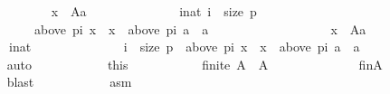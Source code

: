 \begin{isabellebody}
\ \ \ \ \ \ \ \ \isamarkupfalse%
\isanewline
\ \ \ \ \ \ \ \ \ \ {\isachardoublequoteopen}{\isasymnot}{\isacharparenleft}{\kern0pt}{\isasymforall}x\ {\isasymin}\ A{\isacharminus}{\kern0pt}{\isacharbraceleft}{\kern0pt}a{\isacharbraceright}{\kern0pt}{\isachardot}{\kern0pt}\isanewline
\ \ \ \ \ \ \ \ \ \ \ \ \ \ {\isasymforall}i{\isacharcolon}{\kern0pt}{\isacharcolon}{\kern0pt}nat{\isachardot}{\kern0pt}\ i\ {\isacharless}{\kern0pt}\ size\ p\ {\isasymlongrightarrow}\isanewline
\ \ \ \ \ \ \ \ \ \ \ \ \ \ \ \ {\isacharparenleft}{\kern0pt}above\ {\isacharparenleft}{\kern0pt}p{\isacharbang}{\kern0pt}i{\isacharparenright}{\kern0pt}\ x\ {\isacharequal}{\kern0pt}\ {\isacharbraceleft}{\kern0pt}x{\isacharbraceright}{\kern0pt}\ {\isasymlongrightarrow}\ above\ {\isacharparenleft}{\kern0pt}p{\isacharbang}{\kern0pt}i{\isacharparenright}{\kern0pt}\ a\ {\isasymnoteq}\ {\isacharbraceleft}{\kern0pt}a{\isacharbraceright}{\kern0pt}{\isacharparenright}{\kern0pt}{\isacharparenright}{\kern0pt}{\isachardoublequoteclose}\isanewline
\ \ \ \ \ \ \ \ \isamarkupfalse%
\isanewline
\ \ \ \ \ \ \ \ \ \ {\isachardoublequoteopen}{\isasymexists}x\ {\isasymin}\ A{\isacharminus}{\kern0pt}{\isacharbraceleft}{\kern0pt}a{\isacharbraceright}{\kern0pt}{\isachardot}{\kern0pt}\isanewline
\ \ \ \ \ \ \ \ \ \ \ \ {\isasymexists}i{\isacharcolon}{\kern0pt}{\isacharcolon}{\kern0pt}nat{\isachardot}{\kern0pt}\isanewline
\ \ \ \ \ \ \ \ \ \ \ \ \ \ i\ {\isacharless}{\kern0pt}\ size\ p\ {\isasymand}\ above\ {\isacharparenleft}{\kern0pt}p{\isacharbang}{\kern0pt}i{\isacharparenright}{\kern0pt}\ x\ {\isacharequal}{\kern0pt}\ {\isacharbraceleft}{\kern0pt}x{\isacharbraceright}{\kern0pt}\ {\isasymand}\ above\ {\isacharparenleft}{\kern0pt}p{\isacharbang}{\kern0pt}i{\isacharparenright}{\kern0pt}\ a\ {\isacharequal}{\kern0pt}\ {\isacharbraceleft}{\kern0pt}a{\isacharbraceright}{\kern0pt}{\isachardoublequoteclose}\isanewline
\ \ \ \ \ \ \ \ \ \ \isamarkupfalse%
\ auto\isanewline
\ \ \ \ \ \ \ \ \isamarkupfalse%
\ \isamarkupfalse%
\ this\ \isamarkupfalse%
\isanewline
\ \ \ \ \ \ \ \ \ \ {\isachardoublequoteopen}finite\ A\ {\isasymand}\ A\ {\isasymnoteq}\ {\isacharbraceleft}{\kern0pt}{\isacharbraceright}{\kern0pt}{\isachardoublequoteclose}\isanewline
\ \ \ \ \ \ \ \ \ \ \isamarkupfalse%
\ fin{\isacharunderscore}{\kern0pt}A\isanewline
\ \ \ \ \ \ \ \ \ \ \isamarkupfalse%
\ blast\isanewline
\ \ \ \ \ \ \ \ \isamarkupfalse%
\ \isamarkupfalse%
\ asm{}\ \isamarkupfalse%

\end{isabellebody}
